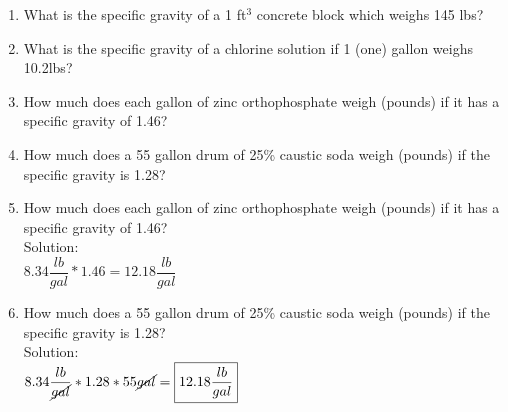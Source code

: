 \documentclass{article}
\begin{document}
\begin{enumerate}

\item What is the specific gravity of a 1 ft$^3$ concrete block which weighs 145 lbs?

\item What is the specific gravity of a chlorine solution if 1 (one) gallon weighs 10.2lbs?

\item How much does each gallon of zinc orthophosphate weigh (pounds) if it has a specific gravity of 1.46?

\item How much does a 55 gallon drum of 25\% caustic soda weigh (pounds) if the specific gravity is 1.28?

\item How much does each gallon of zinc orthophosphate weigh (pounds) if it has a specific gravity of 1.46?\\
\vspace{0.2cm}
Solution:\\
\vspace{0.2cm}
$8.34\dfrac{lb}{gal}*1.46=\boxed{12.18\dfrac{lb}{gal}}$
\vspace{0.2cm}
\item How much does a 55 gallon drum of 25\% caustic soda weigh (pounds) if the specific gravity is 1.28?\\
\vspace{0.2cm}
Solution:\\
\vspace{0.2cm}
$8.34\dfrac{lb}{\cancel{gal}}*1.28*55\cancel{gal}=\boxed{12.18\dfrac{lb}{gal}}$
\vspace{0.2cm}

\end{enumerate}
\end{document}
